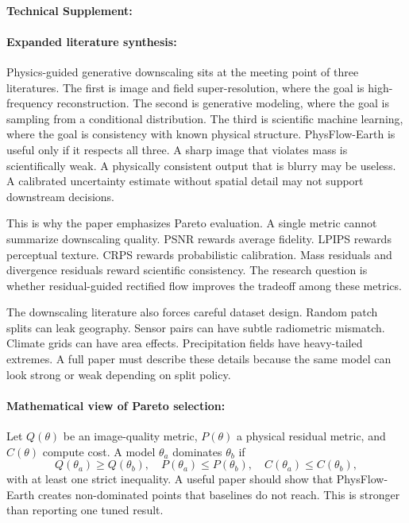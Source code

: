 \documentclass{article}
\begin{document}
\paragraph{Technical Supplement:}

\paragraph{Expanded literature synthesis:}

Physics-guided generative downscaling sits at the meeting point of three literatures. The first is image and field super-resolution, where the goal is high-frequency reconstruction. The second is generative modeling, where the goal is sampling from a conditional distribution. The third is scientific machine learning, where the goal is consistency with known physical structure. PhysFlow-Earth is useful only if it respects all three. A sharp image that violates mass is scientifically weak. A physically consistent output that is blurry may be useless. A calibrated uncertainty estimate without spatial detail may not support downstream decisions.

This is why the paper emphasizes Pareto evaluation. A single metric cannot summarize downscaling quality. PSNR rewards average fidelity. LPIPS rewards perceptual texture. CRPS rewards probabilistic calibration. Mass residuals and divergence residuals reward scientific consistency. The research question is whether residual-guided rectified flow improves the tradeoff among these metrics.

The downscaling literature also forces careful dataset design. Random patch splits can leak geography. Sensor pairs can have subtle radiometric mismatch. Climate grids can have area effects. Precipitation fields have heavy-tailed extremes. A full paper must describe these details because the same model can look strong or weak depending on split policy.

\paragraph{Mathematical view of Pareto selection:}

Let $Q(\theta)$ be an image-quality metric, $P(\theta)$ a physical residual metric, and $C(\theta)$ compute cost. A model $\theta_a$ dominates $\theta_b$ if
\begin{equation}
  Q(\theta_a)\ge Q(\theta_b),\quad
  P(\theta_a)\le P(\theta_b),\quad
  C(\theta_a)\le C(\theta_b),
\end{equation}
with at least one strict inequality. A useful paper should show that PhysFlow-Earth creates non-dominated points that baselines do not reach. This is stronger than reporting one tuned result.
\end{document}
